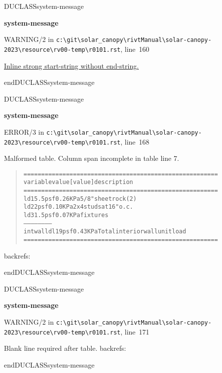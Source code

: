 \documentclass[12pt,notitle,letterpaper]{report}
\newenvironment{DUclass}[1]%
  {%
   \def\DocutilsClassFunctionName{DUCLASS#1}
     \csname \DocutilsClassFunctionName \endcsname}%
  {\csname end\DocutilsClassFunctionName \endcsname}%
\newenvironment{DUadmonition}%
  {\begin{center}
     \begin{lrbox}{\DUadmonitionbox}
       \begin{minipage}{0.9\linewidth}
  }%
  {    \end{minipage}
     \end{lrbox}
     \fbox{\usebox{\DUadmonitionbox}}
   \end{center}
  }
\providecommand*{\DUtitle}[1]{%
  \smallskip\noindent\textbf{#1}\smallskip}
\begin{document}
\begin{DUclass}{system-message}
\begin{DUadmonition}
\DUtitle{system-message
\raisebox{1em}{\hypertarget{system-message-10}{}}}

{\color{red}WARNING/2} in \texttt{c:\textbackslash{}git\textbackslash{}solar\_canopy\textbackslash{}rivtManual\textbackslash{}solar-canopy-2023\textbackslash{}resource\textbackslash{}rv00-temp\textbackslash{}r0101.rst}, line~160

\hyperlink{problematic-10}{
Inline strong start-string without end-string.
}\end{DUadmonition}
\end{DUclass}

\begin{DUclass}{system-message}
\begin{DUadmonition}
\DUtitle{system-message
}

{\color{red}ERROR/3} in \texttt{c:\textbackslash{}git\textbackslash{}solar\_canopy\textbackslash{}rivtManual\textbackslash{}solar-canopy-2023\textbackslash{}resource\textbackslash{}rv00-temp\textbackslash{}r0101.rst}, line~168

Malformed table.
Column span incomplete in table line 7.

\begin{quote}
\begin{alltt}
==========  =======  =========  =============================
variable      value    [value]  description
==========  =======  =========  =============================
ld1         5.5 psf   0.26 KPa  5/8" sheet rock (2)
ld2           2 psf   0.10 KPa  2x4 studs at 16" o.c.
ld3         1.5 psf   0.07 KPa  fixtures
------       ------     ------  ------
intwalldl1    9 psf   0.43 KPa  Total interior wall unit load
==========  =======  =========  =============================
\end{alltt}
\end{quote}
backrefs: \end{DUadmonition}
\end{DUclass}

\begin{DUclass}{system-message}
\begin{DUadmonition}
\DUtitle{system-message
}

{\color{red}WARNING/2} in \texttt{c:\textbackslash{}git\textbackslash{}solar\_canopy\textbackslash{}rivtManual\textbackslash{}solar-canopy-2023\textbackslash{}resource\textbackslash{}rv00-temp\textbackslash{}r0101.rst}, line~171

Blank line required after table.
backrefs: \end{DUadmonition}
\end{DUclass}
\end{document}
